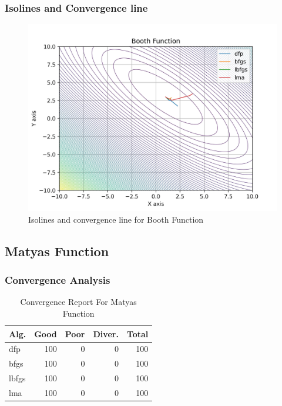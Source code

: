 \documentclass[conference]{IEEEtran}
\begin{document}
\subsubsection{Isolines and Convergence line}
\label{isolinesbooth2D}

\begin{figure}[H]
\centering
\caption{Isolines and convergence line for Booth Function}
\label{fig:booth}
\includegraphics[scale=0.5]{images/booth.jpg}
\end{figure}
\subsection{Matyas Function}
\label{matyas2D}

\subsubsection{Convergence Analysis}
\label{convergencematyas2D}

\begin{table}[H]
\centering
\caption{Convergence Report For Matyas Function}
\label{convergence:matyas}
\begin{tabular}{lrrrr}
\toprule
 Alg. &  Good &  Poor &  Diver. &  Total \\
\midrule
  dfp &   100 &     0 &       0 &    100 \\
 bfgs &   100 &     0 &       0 &    100 \\
lbfgs &   100 &     0 &       0 &    100 \\
  lma &   100 &     0 &       0 &    100 \\
\bottomrule
\end{tabular}
\end{table}
\end{document}
